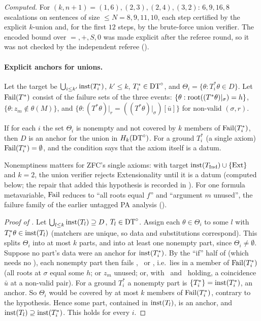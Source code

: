 \emph{Computed.} For $(k,n+1)=(1,6),(2,3),(2,4),(3,2)$: $6,9,16,8$ escalations on sentences of size $\le N=8,9,11,10$, each step certified by the explicit $k$-union and, for the first $12$ steps, by the brute-force union verifier. The encoded bound over $=,+,S,0$ was made explicit after the referee round, so it was not checked by the independent referee ().

\paragraph{Explicit anchors for unions.} Let the target be $\bigcup_{i\le k'}\mathrm{inst}(T^*_i)$, $k'\le k$, $T^*_i\in\mathrm{DT}^{\circ}$, and $\Theta_i=\{\theta:T^*_i\theta\in D\}$. Let $\mathrm{Fail}(T^*)$ consist of the failure sets of the three events: $\{\theta:\mathrm{root}((T^*\theta)|_\sigma)=h\}$, $\{\theta:z_m\notin\theta(M)\}$, and $\{\theta:(T^*\theta)|_r=((T^*\theta)|_\sigma)[\bar u]\}$ for non-valid $(\sigma,r)$.

\begin{proposition}\label{prop:single:untagged-anchor}
If for each $i$ the set $\Theta_i$ is nonempty and not covered by $k$ members of $\mathrm{Fail}(T^*_i)$, then $D$ is an anchor for the union in $H_k(\mathrm{DT}^{\circ})$. For a ground $T^*_i$ (a single axiom) $\mathrm{Fail}(T^*_i)=\emptyset$, and the condition says that the axiom itself is a datum.
\end{proposition}

\noindent Nonemptiness matters for ZFC's single axioms: with target $\mathrm{inst}(T_{\mathrm{Ind}})\cup\{\mathrm{Ext}\}$ and $k=2$, the union verifier rejects Extensionality until it is a datum (computed below; the repair that added this hypothesis is recorded in ). For one formula metavariable, $\mathrm{Fail}$ reduces to ``all roots equal $f$'' and ``argument $m$ unused'', the failure family of the earlier untagged PA analysis ().

\begin{proof}[Proof of ]
Let $\bigcup_{l\le k}\mathrm{inst}(T_l)\supseteq D$, $T_l\in\mathrm{DT}^{\circ}$. Assign each $\theta\in\Theta_i$ to some $l$ with $T^*_i\theta\in\mathrm{inst}(T_l)$ (matchers are unique, so data and substitutions correspond). This splits $\Theta_i$ into at most $k$ parts, and into at least one nonempty part, since $\Theta_i\neq\emptyset$. Suppose no part's data were an anchor for $\mathrm{inst}(T^*_i)$. By the ``if'' half of  (which needs no \Rich), each nonempty part then fails \evRs, \evN\ or \evU, i.e.\ lies in a member of $\mathrm{Fail}(T^*_i)$ (all roots at $\sigma$ equal some $h$; or $z_m$ unused; or, with \evRs\ and \evN\ holding, a coincidence $\bar u$ at a non-valid pair). For a ground $T^*_i$ a nonempty part is $\{T^*_i\}=\mathrm{inst}(T^*_i)$, an anchor. So $\Theta_i$ would be covered by at most $k$ members of $\mathrm{Fail}(T^*_i)$, contrary to the hypothesis. Hence some part, contained in $\mathrm{inst}(T_l)$, is an anchor, and $\mathrm{inst}(T_l)\supseteq\mathrm{inst}(T^*_i)$. This holds for every $i$.
\end{proof}

